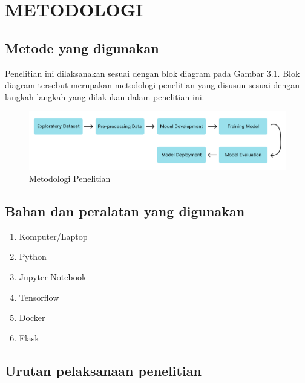 \chapter{METODOLOGI}

\section{Metode yang digunakan}

Penelitian ini dilaksanakan sesuai dengan blok diagram pada Gambar 3.1. Blok diagram tersebut
merupakan metodologi penelitian yang disusun sesuai dengan langkah-langkah yang dilakukan dalam penelitian ini.

\begin{figure} [ht] \centering
  \includegraphics[width=160mm]{gambar/diagram-blok.png}
  \caption{Metodologi Penelitian}
\end{figure}

\section{Bahan dan peralatan yang digunakan}
\begin{enumerate}[noitemsep]
  \item Komputer/Laptop
  \item Python
  \item Jupyter Notebook
  \item Tensorflow
  \item Docker
  \item Flask
\end{enumerate}

\section{Urutan pelaksanaan penelitian}

